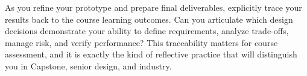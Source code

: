 \begin{protip}
As you refine your prototype and prepare final deliverables, explicitly trace your results back to the course learning outcomes. Can you articulate which design decisions demonstrate your ability to define requirements, analyze trade-offs, manage risk, and verify performance? This traceability matters for course assessment, and it is exactly the kind of reflective practice that will distinguish you in Capstone, senior design, and industry.
\end{protip}

